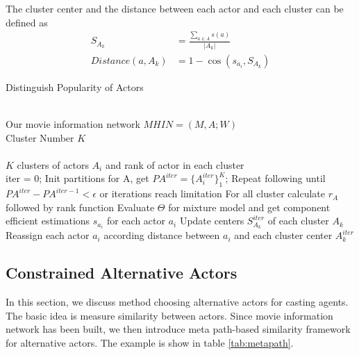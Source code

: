 The cluster center and the distance between each actor and each cluster can be defined as
\begin{subequations}
\begin{align}
  S_{A_k} &= \frac{\sum_{a \in A}s(a)}{|A_k|} \\
  Distance(a, A_k) &= 1-\cos(s_{a_i}, S_{A_k})
\end{align}
\end{subequations}

\begin{algorithm}[htb]
\renewcommand{\algorithmicrequire}{\textbf{Input:}}
\renewcommand\algorithmicensure {\textbf{Output:} }
\caption{Distinguish Popularity of Actors}

\begin{algorithmic}[1]

\REQUIRE ~~\\
Our movie information network $MHIN=(M, A; W)$\\
Cluster Number $K$\\

\ENSURE ~~\\
$K$ clusters of actors $A_i$ and rank of actor in each cluster \\
\STATE iter = 0;
\STATE Init partitions for A, get $PA^{iter}=\{A_i^{iter}\}_1^K$;
\STATE Repeat following until $PA^{iter}-PA^{iter-1}<\epsilon$ or iterations reach limitation
\STATE \quad For all cluster calculate $r_A$ followed by rank function
\STATE \quad Evaluate $\Theta$ for mixture model and get component efficient estimations $s_{a_i}$ for each actor $a_i$
\STATE \quad Update centers $S_{A_k}^{iter}$ of each cluster $A_k$
\STATE \quad Reassign each actor $a_i$ according distance between $a_i$ and each cluster center $A_k^{iter}$
\end{algorithmic}
\end{algorithm}


\subsection{Constrained Alternative Actors}
In this section, we discuss method choosing alternative actors for casting agents. The basic idea is measure similarity between actors. Since movie information network has been built, we then introduce meta path-based similarity framework \cite{sun2011pathsim:} for alternative actors. The example is show in table \ref{tab:metapath}.

